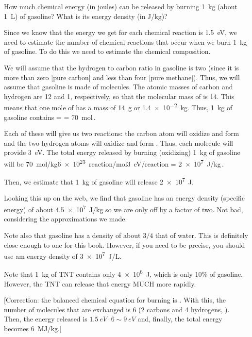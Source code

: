 How much chemical energy (in joules) can be released by burning \SI{1}{kg} (about \SI{1}{L}) of gasoline? What is its energy density (in \si{J/kg})?

Since we know that the energy we get for each chemical reaction is \SI{1.5}{eV}, we need to estimate the number of chemical reactions that occur when we burn \SI{1}{kg} of gasoline. To do this we need to estimate the chemical composition.

We will assume that the hydrogen to carbon ratio in gasoline is two (since it is more than zero [pure carbon] and less than four [pure methane]). Thus, we will assume that gasoline is made of  molecules. The atomic masses of carbon and hydrogen are 12 and 1, respectively, so that the molecular mass of  is 14. This means that one mole of  has a mass of \SI{14}{g} or \SI{1.4e-2}{kg}. Thus, \SI{1}{kg} of gasoline contains
%
\beq
    \npart =   = \SI{70}{mol}\,. 
\eeq

Each of these   will give us two reactions: the carbon atom will oxidize and form  and the two hydrogen atoms will oxidize and form . Thus, each  molecule will provide \SI{3}{eV}. The total energy released by burning (oxidizing) \SI{1}{kg} of gasoline will be
%
\beq
    \SI{70}{mol/kg}\cdot\SI{6e23}{reaction/mol}\cdot\SI{3}{eV/reaction} = \SI{2e7}{J/kg}\,.
\eeq

Then, we estimate that \SI{1}{kg} of gasoline will release \SI{2e7}{J}.

Looking this up on the web, we find that gasoline has an energy density \sic (specific energy) of about \SI{4.5e7}{J/kg} so we are only off by a factor of two. Not bad, considering the approximations we made.

Note also that gasoline has a density of about $3/4$ that of water. This is definitely close enough to one for this book. However, if you need to be precise, you should use am energy density of \SI{3e7}{J/L}.

Note that \SI{1}{kg} of TNT contains only \SI{4e6}{J}, which is only 10\% of gasoline. However, the TNT can release that energy MUCH more rapidly.

[Correction: the balanced chemical equation for  burning is . With this, the number of molecules that are exchanged is 6 (2 carbons and 4 hydrogens, ). Then, the energy released is $\SI{1.5}{eV}\cdot 6\sim\SI{9}{eV}$ and, finally, the total energy becomes \SI{6}{MJ/kg}.]


